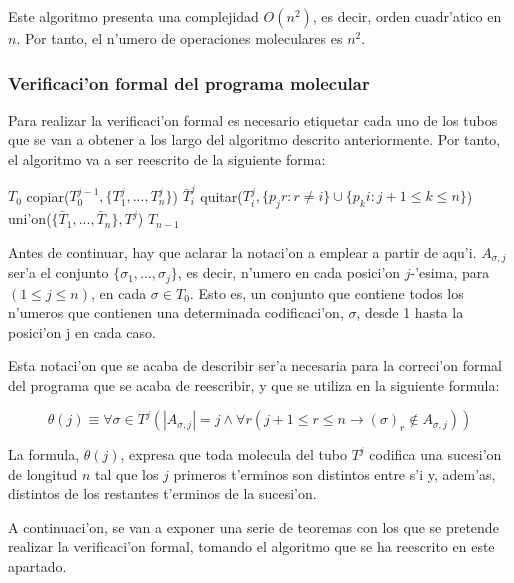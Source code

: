 \documentclass[12pt]{article}
\begin{document}
Este algoritmo presenta una complejidad $O(n^2)$, es decir, orden cuadr'atico en $n$. Por tanto, el n'umero de
operaciones moleculares es $n^2$.

\subsubsection{Verificaci'on formal del programa molecular}

Para realizar la verificaci'on formal es necesario etiquetar cada uno de los tubos que se van a obtener
a los largo del algoritmo descrito anteriormente. Por tanto, el algoritmo va a ser reescrito de la
siguiente forma:

\begin{algorithmic}
    \Require $T_{0}$
        \State copiar($T^{j-1}_{0}, \{T^{j}_{1},...,T^{j}_{n}\}$)
            \State $\bar{T}^{j}_{i}$ \leftarrow quitar($T^{j}_{i}, \{p_{j}r : r \neq i\} \cup \{p_{k}i : j + 1 \leq k \leq n\} $)
        \EndFor
        \State uni'on($\{\bar{T}_{1},...,\bar{T}_{n}\},T^{j}$)
    \EndFor
    \Return $T_{n - 1}$
\end{algorithmic}

Antes de continuar, hay que aclarar la notaci'on a emplear a partir de aqu'i. $A_{\sigma,j}$ ser'a el conjunto
$\{\sigma_{1},...,\sigma_{j}\}$, es decir, n'umero en cada posici'on $j$-'esima, para $(1 \leq j \leq n)$, en cada
$\sigma \in T_{0}$. Esto es, un conjunto que contiene todos los n'umeros que contienen una determinada codificaci'on, $\sigma$,
desde 1 hasta la posici'on j en cada caso.

Esta notaci'on que se acaba de describir ser'a necesaria para la correci'on formal del programa que se
acaba de reescribir, y que se utiliza en la siguiente formula:

\begin{equation*}
  \theta(j) \equiv \forall \sigma \in T^{j} (|A_{\sigma,j}| = j \land \forall r ( j + 1 \leq r \leq n \longrightarrow
  (\sigma)_{r} \notin A_{\sigma,j} ))
\end{equation*}

La formula, $\theta(j)$, expresa que toda molecula del tubo $T^{j}$ codifica una sucesi'on de longitud $n$ tal que
los $j$ primeros t'erminos son distintos entre s'i y, adem'as, distintos de los restantes t'erminos de la sucesi'on.

A continuaci'on, se van a exponer una serie de teoremas con los que se pretende realizar la verificaci'on formal,
tomando el algoritmo que se ha reescrito en este apartado.
\end{document}
